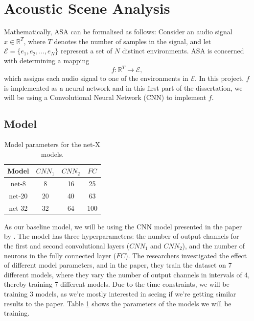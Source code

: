 \documentclass[logo,bsc,singlespacing,parskip,online]{infthesis}
\begin{document}


\section{Acoustic Scene Analysis}
\label{sec:methodology-asa}
Mathematically, ASA can be formalised as follows:
Consider an audio signal \(x \in \mathbb{R}^{T}\), where \(T\) denotes the number of samples in the signal, and let \(\mathcal{E} = \{e_1, e_2, \ldots, e_N\}\) represent a set of \(N\) distinct environments. ASA is concerned with determining a mapping 
\[
f: \mathbb{R}^{T} \rightarrow \mathcal{E},
\]
which assigns each audio signal to one of the environments in \(\mathcal{E}\). In this project, \(f\) is implemented as a neural network
and in this first part of the dissertation, we will be using a Convolutional Neural Network (CNN) to implement \(f\).

\subsection{Model}
\label{sec:asa-model}
\begin{table}[h]
   \centering
   \begin{tabular}{|c|c|c|c|}
      \hline
      Model & $CNN_1$ & $CNN_2$ & $FC$ \\
      \hline
      net-8 & 8 & 16 & 25 \\
      net-20 & 20 & 40 & 63 \\
      net-32 & 32 & 64 & 100 \\
      \hline
   \end{tabular}
   \caption{Model parameters for the net-X models.}
   \label{tab:cnn-model-params}
\end{table}
As our baseline model, we will be using the CNN model presented in the paper by \citet{Huwel2020HearDS}. 
The model has three hyperparameters: the number of output channels for the first and second convolutional layers ($CNN_1$ and $CNN_2$),
and the number of neurons in the fully connected layer ($FC$). The researchers investigated the effect of different model parameters, 
and in the paper, they train the dataset on 7 different models, where they vary the number of output channels in intervals of 4, thereby training 7 different models.
Due to the time constraints, we will be training 3 models, as we're mostly interested in seeing if we're getting similar results to the paper.
Table \ref{tab:cnn-model-params} shows the parameters of the models we will be training.
\end{document}
